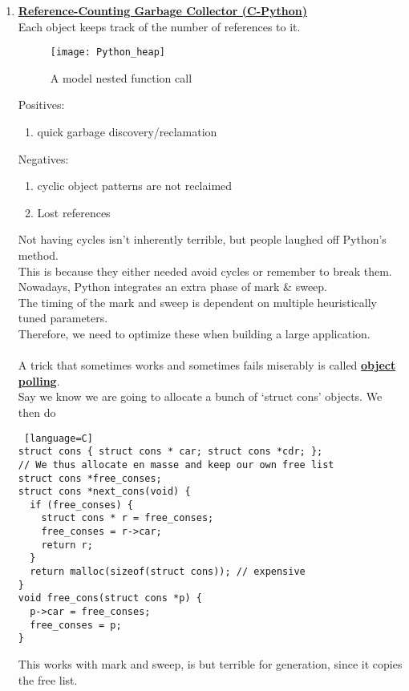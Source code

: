 \documentclass[../../lecture_notes.tex]{subfiles}
\begin{document}
\begin{enumerate} [itemsep=0mm]
	\item \textbf{\underline{Reference-Counting Garbage Collector (C-Python)}}\\
		Each object keeps track of the number of references to it.

		\begin{figure}[H]
			\centering
			\texttt{[image: Python\_heap]}
			\caption{A model nested function call}
			\label{fig:test}
		\end{figure}


		Positives: \begin{enumerate} [itemsep=0mm]
				\item quick garbage discovery/reclamation
			\end{enumerate}
		Negatives: \begin{enumerate} [itemsep=0mm]
				\item cyclic object patterns are not reclaimed
				\item Lost references
			\end{enumerate}

		Not having cycles isn’t inherently terrible, but people laughed off Python’s method.\\
		This is because they either needed avoid cycles or remember to break them.\\
		Nowadays, Python integrates an extra phase of mark \& sweep.\\
		The timing of the mark and sweep is dependent on multiple heuristically tuned parameters.\\
		Therefore, we need to optimize these when building a large application.\\
\\
		A trick that sometimes works and sometimes fails miserably is called \textbf{\underline{object polling}}.\\
		Say we know we are going to allocate a bunch of ‘struct cons’ objects. We then do\\
		\begin{lstlisting} [language=C]
struct cons { struct cons * car; struct cons *cdr; }; 
// We thus allocate en masse and keep our own free list
struct cons *free_conses;
struct cons *next_cons(void) {
  if (free_conses) {
    struct cons * r = free_conses;
    free_conses = r->car;
    return r;
  }
  return malloc(sizeof(struct cons)); // expensive
}
void free_cons(struct cons *p) {
  p->car = free_conses;
  free_conses = p;
}
		\end{lstlisting}
    This works with mark and sweep, is but terrible for generation, since it copies the free list.
\end{enumerate}
\end{document}
